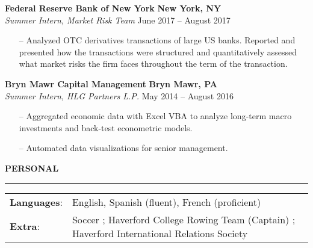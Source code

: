 \documentclass[paper=a4, fontsize=11pt]{scrartcl} %
\newcommand{\I}{--}
\newenvironment{mycenter}[1][\topsep]
  {\setlength{\topsep}{#1}\par\kern\topsep\centering}%
  {\par\kern\topsep}%
\begin{document}
\vspace{1mm}

\textbf{Federal Reserve Bank of New York} \hfill \textbf{New York, NY} \\
\textit{Summer Intern, Market Risk Team} \hfill June 2017 -- August 2017
\begin{itemize}[topsep=0pt,noitemsep]
	\item[\I] Analyzed OTC derivatives transactions of large US banks. Reported and presented
how the transactions were structured and quantitatively assessed what market risks the firm faces throughout the term of the transaction.
\end{itemize}

\textbf{Bryn Mawr Capital Management} \hfill \textbf{Bryn Mawr, PA} \\
\textit{Summer Intern, HLG Partners L.P.} \hfill May 2014 -- August 2016
\begin{itemize}[topsep=0pt,noitemsep]
	\item[\I] Aggregated economic data with Excel VBA to analyze long-term macro investments and back-test econometric models.
	\item[\I] Automated data visualizations for senior management.

\end{itemize}

\vspace{2mm}

\begin{mycenter}[0pt]
\textsc{\textbf{PERSONAL}}
\end{mycenter}

\vspace{-3mm}
\rule{\textwidth}{0.4pt}

\vspace{1.5mm}

\begin{tabularx}{\linewidth}{ll}

\hspace{-3mm}
\textbf{Languages}: & English, Spanish (fluent), French (proficient) \\
[1mm]



\hspace{-3mm}
\textbf{Extra}: & Soccer ; Haverford College Rowing Team (Captain) ; Haverford International Relations Society \\ [1mm]


\end{tabularx}
\end{document}
